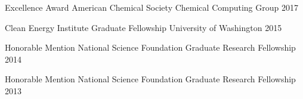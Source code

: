 



\begin{cvhonors}



\cvhonor
{Excellence Award} %
{American Chemical Society Chemical Computing Group} %
{} %
{2017} %




\cvhonor
{Clean Energy Institute Graduate Fellowship} %
{University of Washington} %
{} %
{2015} %




\cvhonor
{Honorable Mention} %
{National Science Foundation Graduate Research Fellowship} %
{} %
{2014} %


\cvhonor
{Honorable Mention} %
{National Science Foundation Graduate Research Fellowship} %
{} %
{2013} %








\end{cvhonors}
\vspace{-1cm}

